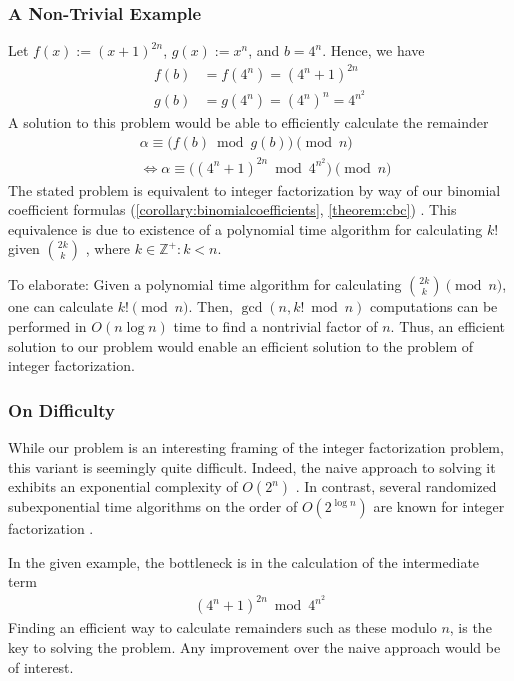 \documentclass[11pt,reqno]{article}
\theoremstyle{plain}
\theoremstyle{definition}
\begin{document}
\subsubsection{A Non-Trivial Example}
Let $f(x) := (x+1)^{2n}$, $g(x) := x^n$, and $b = 4^n$. Hence, we have
\begin{align*}
    f(b) &= f(4^n) = (4^n+1)^{2n} \\
    g(b) &= g(4^n) = (4^n)^n = 4^{n^2}
\end{align*}
A solution to this problem would be able to efficiently calculate the remainder
\begin{align*}
 & \alpha \equiv \bigl( f(b) \bmod {g(b)} \bigr) \pmod{n} \\
 & \Longleftrightarrow
 \alpha \equiv \bigl( (4^n+1)^{2n} \bmod {4^{n^2}} \bigr) \pmod{n}
\end{align*}
The stated problem is equivalent to integer factorization by way of our binomial coefficient formulas (\cref{corollary:binomialcoefficients}, \cref{theorem:cbc}) \cite{shunia2023simple}. This equivalence is due to existence of a polynomial time algorithm for calculating $k!$ given $\binom{2k}{k}$ \cite{A000984}, where $k \in \mathbb{Z}^+ : k < n$.

To elaborate: Given a polynomial time algorithm for calculating $\binom{2k}{k} \pmod{n}$, one can calculate $k! \pmod{n}$. Then, $\gcd(n, k! \bmod{n})$ computations can be performed in $O(n \log n)$ time to find a nontrivial factor of $n$. Thus, an efficient solution to our problem would enable an efficient solution to the problem of integer factorization.

\subsubsection{On Difficulty}
While our problem is an interesting framing of the integer factorization problem, this variant is seemingly quite difficult. Indeed, the naive approach to solving it exhibits an exponential complexity of $O(2^n)$ \cite{shunia2023simple}. In contrast, several randomized subexponential time algorithms on the order of $O(2^{\log n})$ are known for integer factorization \cite{pomerance1998sieves}.

In the given example, the bottleneck is in the calculation of the intermediate term
\begin{align*}
    (4^n+1)^{2n} \bmod {4^{n^2}}
\end{align*}
Finding an efficient way to calculate remainders such as these modulo $n$, is the key to solving the problem. Any improvement over the naive approach would be of interest.
\end{document}
